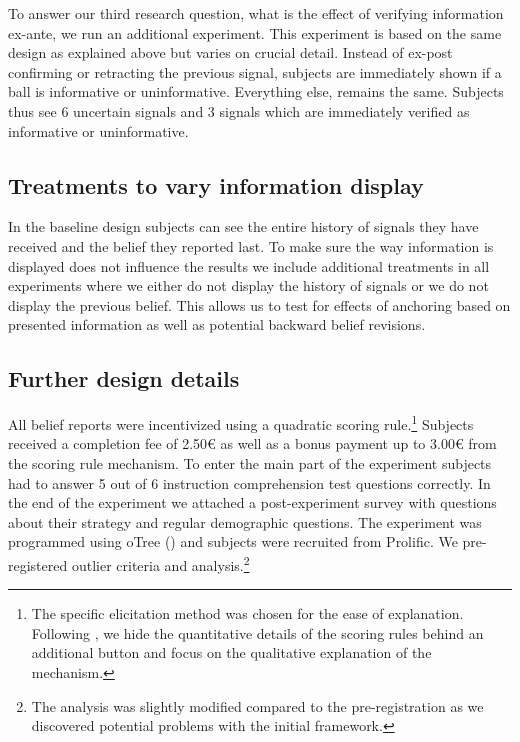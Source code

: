 \documentclass{article}
\begin{document}
To answer our third research question, what is the effect of verifying information ex-ante, we run an additional experiment. This experiment is based on the same design as explained above but varies on crucial detail. Instead of ex-post confirming or retracting the previous signal, subjects are immediately shown if a ball is informative or uninformative. Everything else, remains the same. Subjects thus see 6 uncertain signals and 3 signals which are immediately verified as informative or uninformative.


\subsection{Treatments to vary information display}

In the baseline design subjects can see the entire history of signals they have received and the belief they reported last. To make sure the way information is displayed does not influence the results we include additional treatments in all experiments where we either do not display the history of signals or we do not display the previous belief. This allows us to test for effects of anchoring based on presented information as well as potential backward belief revisions.


\subsection{Further design details}

All belief reports were incentivized using a quadratic scoring rule.\footnote{The specific elicitation method was chosen for the ease of explanation. Following \cite{Danz2020}%
, we hide the quantitative details of the scoring rules behind an additional button and focus on the qualitative explanation of the mechanism.} Subjects received a completion fee of 2.50\euro\xspace as well as a bonus payment up to 3.00\euro\xspace from the scoring rule mechanism. To enter the main part of the experiment subjects had to answer 5 out of 6 instruction comprehension test questions correctly. In the end of the experiment we attached a post-experiment survey with questions about their strategy and regular demographic questions. The experiment was programmed using oTree (\cite{Chen2016}) and subjects were recruited from Prolific. We pre-registered outlier criteria and analysis.\footnote{The analysis was slightly modified compared to the pre-registration as we discovered potential problems with the initial framework.}
\end{document}
